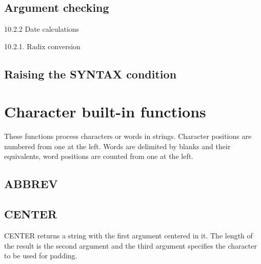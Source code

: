 \subsection{Argument checking}\label{argument-checking}



10.2.2 Date calculations



10.2.1. Radix conversion



\subsection{Raising the SYNTAX
condition}\label{raising-the-syntax-condition}



\section{Character built-in
functions}\label{character-built-in-functions}

These functions process characters or words in strings. Character
positions are numbered from one at the left. Words are delimited by
blanks and their equivalents, word positions are counted from one at the
left.

\subsection{ABBREV}\label{abbrev}



\subsection{CENTER}\label{center}

CENTER returns a string with the first argument centered in it. The
length of the result is the second argument and the third argument
specifies the character to be used for padding.



